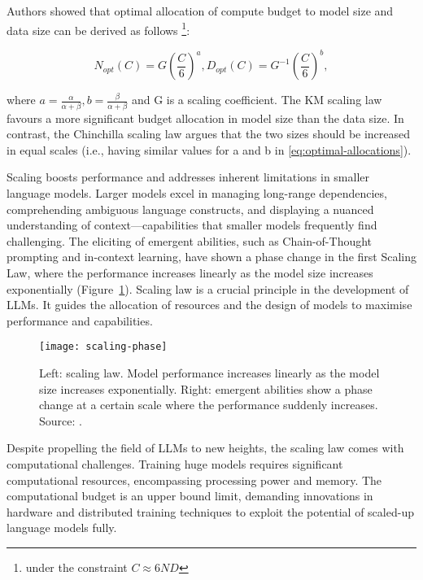 \begin{enumerate}
{		      Authors showed that optimal allocation of compute budget to model size and data size can be derived as follows \footnote{under the constraint \(C \approx 6ND\)}:

		      \begin{center}
			      \begin{equation}
				      N_{opt}(C) = G(\frac{C}{6})^a, D_{opt}(C) = G^{-1}(\frac{C}{6})^b, \label{eq:optimal-allocations}
			      \end{equation}
		      \end{center}

		      \noindent where $a=\frac{\alpha}{\alpha+\beta}, b=\frac{\beta}{\alpha+\beta}$ and G is a scaling coefficient.
		      The KM scaling law favours a more significant budget allocation in model size than the data size. In contrast, the Chinchilla scaling law argues that the two sizes should be increased in equal scales \cite{hoffmann2022training} (i.e., having similar values for a and b in \eqref{eq:optimal-allocations}).
	      }
\end{enumerate}

Scaling boosts performance and addresses inherent limitations in smaller language models.
Larger models excel in managing long-range dependencies, comprehending ambiguous language constructs, and displaying a nuanced understanding of context---capabilities that smaller models frequently find challenging.
The eliciting of emergent abilities, such as Chain-of-Thought prompting and in-context learning, have shown a phase change in the first Scaling Law, where the performance increases linearly as the model size increases exponentially (Figure~\ref{fig:scaling-phase}).
Scaling law is a crucial principle in the development of LLMs. It guides the allocation of resources and the design of models to maximise performance and capabilities.

\begin{figure}[h!]
	\centering
	\texttt{[image: scaling-phase]}
	\caption{Left: scaling law. Model performance increases linearly as the model size increases exponentially. Right: emergent abilities show a phase change at a certain scale where the performance suddenly increases. Source: \protect\textcite{yaofu2023emergent}.}
	\label{fig:scaling-phase}
\end{figure}

Despite propelling the field of LLMs to new heights, the scaling law comes with computational challenges.
Training huge models requires significant computational resources, encompassing processing power and memory.
The computational budget is an upper bound limit, demanding innovations in hardware and distributed training techniques to exploit the potential of scaled-up language models fully.


